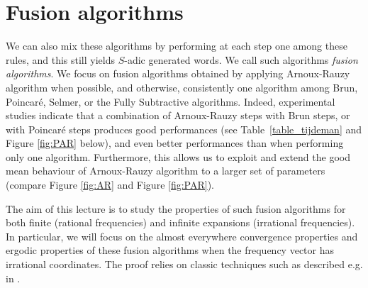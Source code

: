 \documentclass[preliminary,copyright,creativecommons]{eptcs}
\begin{document}
\section{Fusion algorithms}

We can also mix these   algorithms by  performing at each step  one  among  these   rules, and this still yields
$S$-adic generated words. We call such  algorithms  {\em fusion algorithms}. We  focus on 
fusion algorithms obtained by  applying Arnoux-Rauzy algorithm when possible, and  otherwise,    consistently  one  algorithm   among    Brun, Poincar\'e, Selmer,
or the Fully Subtractive algorithms. Indeed, experimental studies   indicate that a combination of  Arnoux-Rauzy steps with  Brun steps,  or   with Poincar\'e  steps 
produces     good   performances   (see Table~\ref{table_tijdeman} and    Figure  \ref{fig:PAR} below), and
even better performances    than   when performing only one  algorithm.     Furthermore,  this allows us
to   exploit and extend  the good mean  behaviour of Arnoux-Rauzy  algorithm   to a larger set of parameters  (compare Figure \ref{fig:AR} and Figure \ref{fig:PAR}).


The aim of this lecture is to  study   the properties of     such  fusion   algorithms for both  finite  (rational frequencies) and infinite expansions (irrational  frequencies).
In particular, we will  focus on 
the almost everywhere  convergence properties    and  ergodic  properties of    these fusion  algorithms  when the   frequency  vector
has irrational coordinates. The  proof relies on classic techniques
   such as described  e.g. in \cite{schweiger}.
\end{document}
